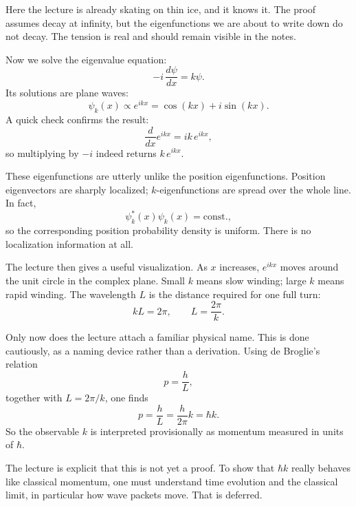 Here the lecture is already skating on thin ice, and it knows it. The proof assumes decay at infinity, but the eigenfunctions we are about to write down do not decay. The tension is real and should remain visible in the notes.

Now we solve the eigenvalue equation:
\begin{equation}
-i\,\frac{d\psi}{dx}=k\psi.
\end{equation}
Its solutions are plane waves:
\begin{equation}
\psi_k(x)\propto e^{ikx}=\cos(kx)+i\sin(kx).
\end{equation}
A quick check confirms the result:
\begin{equation}
\frac{d}{dx}e^{ikx}=ik\,e^{ikx},
\end{equation}
so multiplying by \(-i\) indeed returns \(k\,e^{ikx}\).

These eigenfunctions are utterly unlike the position eigenfunctions. Position eigenvectors are sharply localized; \(k\)-eigenfunctions are spread over the whole line. In fact,
\begin{equation}
\psi_k^*(x)\psi_k(x)=\text{const.},
\end{equation}
so the corresponding position probability density is uniform. There is no localization information at all.

The lecture then gives a useful visualization. As \(x\) increases, \(e^{ikx}\) moves around the unit circle in the complex plane. Small \(k\) means slow winding; large \(k\) means rapid winding. The wavelength \(L\) is the distance required for one full turn:
\begin{equation}
kL=2\pi,
\qquad
L=\frac{2\pi}{k}.
\end{equation}

Only now does the lecture attach a familiar physical name. This is done cautiously, as a naming device rather than a derivation. Using de Broglie's relation
\begin{equation}
p=\frac{h}{L},
\end{equation}
together with \(L=2\pi/k\), one finds
\begin{equation}
p=\frac{h}{L}=\frac{h}{2\pi}k=\hbar k.
\end{equation}
So the observable \(k\) is interpreted provisionally as momentum measured in units of \(\hbar\).

The lecture is explicit that this is not yet a proof. To show that \(\hbar k\) really behaves like classical momentum, one must understand time evolution and the classical limit, in particular how wave packets move. That is deferred.

